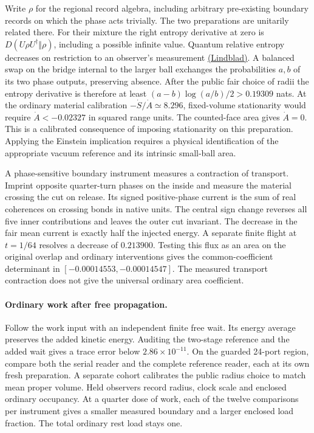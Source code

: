 \documentclass[11pt]{article}
\begin{document}
Write $\rho$ for the regional record algebra, including arbitrary
pre-existing boundary records on which the phase acts trivially. The
two preparations are unitarily related there. For their mixture the
right entropy derivative at zero is
$D(U\rho U^\dagger\Vert\rho)$, including a possible infinite value.
Quantum relative entropy decreases on restriction to an observer's
measurement \href{https://doi.org/10.1007/BF01609396}{(Lindblad)}.
A balanced swap on the bridge internal to the larger ball exchanges
the probabilities $a,b$ of its two phase outputs, preserving absence.
After the public fair choice of radii the entropy derivative is
therefore at least $(a-b)\log(a/b)/2>0.19309$ nats. At the ordinary
material calibration $-\dot S/\dot A\simeq8.296$, fixed-volume
stationarity would require $\dot A<-0.02327$ in squared range units.
The counted-face area gives $\dot A=0$. This is a calibrated consequence of
imposing stationarity on this preparation. Applying the Einstein implication
requires a physical identification of the appropriate vacuum reference and
its intrinsic small-ball area.

A phase-sensitive boundary instrument measures a contraction of
transport. Imprint opposite quarter-turn phases on the inside and measure
the material crossing the cut on release. Its signed positive-phase
current is the sum of real coherences on crossing bonds in native units.
The central sign change reverses all five inner contributions and leaves
the outer cut invariant. The decrease in the fair mean current is exactly
half the injected energy. A separate finite flight at $t=1/64$ resolves
a decrease of $0.213900$. Testing this flux as an area on the original
overlap and ordinary interventions gives the common-coefficient
determinant in $[-0.00014553,-0.00014547]$. The measured transport
contraction does not give the universal ordinary area coefficient.

\paragraph{Ordinary work after free propagation.}
Follow the work input with an independent finite free wait. Its energy
average preserves the added kinetic energy. Auditing the two-stage
reference and the added wait gives a trace error below $2.86\times10^{-11}$.
On the guarded 24-port region, compare both the serial reader and the
complete reference reader, each at its own fresh preparation. A
separate cohort calibrates the public radius choice to match mean
proper volume. Held observers record radius, clock scale and enclosed
ordinary occupancy. At a quarter dose of work, each of the twelve
comparisons per instrument gives a smaller measured boundary and a
larger enclosed load fraction. The total ordinary rest load stays one.
\end{document}
